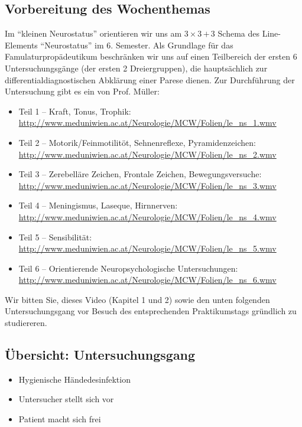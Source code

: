 \subsection{Vorbereitung des Wochenthemas}

Im \enquote{kleinen Neurostatus} orientieren wir uns am
3\,$\times$\,3\,$+$\,3 Schema des Line-Elements
\enquote{Neurostatus} im 6. Semester. 
Als Grundlage für das Famulaturpropädeutikum beschränken wir
uns auf einen Teilbereich der  ersten 6 Untersuchungsgänge
(der ersten 2 Dreiergruppen), die hauptsächlich zur
differentialdiagnostischen Abklärung einer Parese dienen.
Zur Durchführung der Untersuchung gibt es ein
 von Prof. Müller:
\begin{itemize}\small
  \item Teil 1 -- Kraft, Tonus, Trophik:
  \\
  \url{http://www.meduniwien.ac.at/Neurologie/MCW/Folien/le_ns_1.wmv}
  \item Teil 2 -- Motorik/Feinmotilitöt, Sehnenreflexe,
  Pyramidenzeichen:
  \\
  \url{http://www.meduniwien.ac.at/Neurologie/MCW/Folien/le_ns_2.wmv}
  \item Teil 3 -- Zerebelläre Zeichen, Frontale Zeichen,
  Bewegungsversuche:
  \\
  \url{http://www.meduniwien.ac.at/Neurologie/MCW/Folien/le_ns_3.wmv}
  \item Teil 4 -- Meningismus, Laseque, Hirnnerven:
  \\
  \url{http://www.meduniwien.ac.at/Neurologie/MCW/Folien/le_ns_4.wmv}
  \item Teil 5 -- Sensibilität:
  \\
  \url{http://www.meduniwien.ac.at/Neurologie/MCW/Folien/le_ns_5.wmv}
  \item Teil 6 -- Orientierende Neuropsychologische
  Untersuchungen:
  \\
  \url{http://www.meduniwien.ac.at/Neurologie/MCW/Folien/le_ns_6.wmv}
\end{itemize}
Wir bitten Sie,
dieses Video (Kapitel 1 und 2) sowie den unten folgenden
Untersuchungsgang vor Besuch des entsprechenden
Praktikumstags gründlich zu studiereren.

\clearpage
\subsection{Übersicht: Untersuchungsgang}


{\begin{itemize}
  \item Hygienische Händedesinfektion
  \item {Untersucher stellt sich vor}
  \item {Patient macht sich frei}
\end{itemize}}
{}
{}
{}
{}




